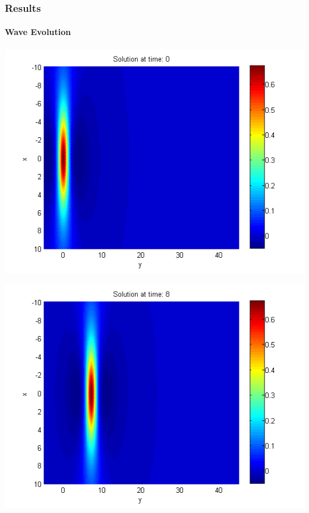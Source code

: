 \documentclass{beamer}
\begin{document}

\begin{frame}
\frametitle{Results}
\framesubtitle{Wave Evolution}
\begin{center}\vspace{0.4cm}
	\begin{minipage}[b]{0.30\linewidth}
		\includegraphics[width=\linewidth]{figures/Solution1_t=0.png}
	\end{minipage}	
	\begin{minipage}[b]{0.30\linewidth}
		\includegraphics[width=\linewidth]{figures/Solution1_t=8.png}
	\end{minipage}	
	\begin{minipage}[b]{0.30\linewidth}

\end{minipage}
\end{center}
\end{frame}
\end{document}
